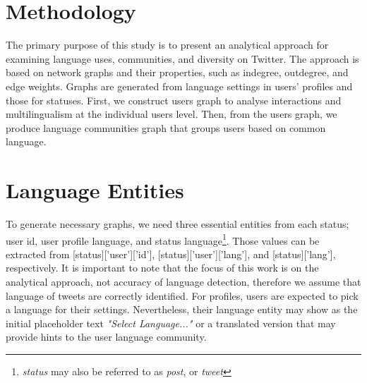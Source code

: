 \documentclass{llncs}
\begin{document}
\section{Methodology}\label{methodology}

The primary purpose of this study is to present an analytical approach
for examining language uses, communities, and diversity on
Twitter. The approach is based on network graphs and their properties,
such as indegree, outdegree, and edge weights. Graphs are generated
from language settings in users' profiles and those for statuses. 
First, we construct users graph to analyse interactions and multilingualism at
the individual users level. Then, from the users graph, we produce language 
communities graph that groups users based on common language.

\section{Language Entities}
To generate necessary graphs, we need three essential entities 
from each status; user id, user profile language, and status language\footnote{
\emph{status} may also be referred to as \emph{post}, or \emph{tweet}}.
Those values can be extracted from [status]['user']['id'], [status]['user']['lang'], and 
[status]['lang'], respectively. It is important to note that the focus of this work is 
on the analytical approach, not accuracy of language detection, 
therefore we assume that language of tweets are correctly identified.
For profiles, users are expected to pick a language for their settings. Nevertheless, 
their language entity may show as the initial placeholder text 
\emph{"Select Language..."} or a translated version that may provide hints 
to the user language community.

\end{document}
